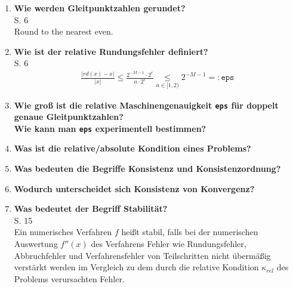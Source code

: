 \begin{enumerate}
		\item \textbf{Wie werden Gleitpunktzahlen gerundet?} \\
		S. 6 \\
		Round to the nearest even.
		\item \textbf{Wie ist der relative Rundungsfehler definiert?} \\
		S. 6
		\begin{align*}
			\frac{|rd(x)-x|}{|x|}\leq \frac{2^{-M-1}\cdot2^e}{a\cdot 2^e}\underset{a\in[1,2)}{\leq}2^{-M-1}=:\texttt{eps}
		\end{align*}
		
		\item \textbf{Wie groß ist die relative Maschinengenauigkeit \texttt{eps} für doppelt genaue Gleitpunktzahlen?\\
					Wie kann man \texttt{eps} experimentell bestimmen?} \\
				
				
		\item \textbf{Was ist die relative/absolute Kondition eines Problems?} \\
		
		
		\item \textbf{Was bedeuten die Begriffe Konsistenz und Konsistenzordnung?} \\
		
		
		\item \textbf{Wodurch unterscheidet sich Konsistenz von Konvergenz?} \\
		
		
		\item \textbf{Was bedeutet der Begriff Stabilität?} \\
		S. 15\\
		Ein numerisches Verfahren $f$ heißt stabil, falls bei der numerischen Auswertung $f''(x)$ des Verfahrens Fehler wie Rundungsfehler, Abbruchfehler und Verfahrensfehler von Teilschritten nicht	übermäßig verstärkt werden im Vergleich zu dem durch die relative Kondition $\kappa_{rel}$ des Problems
		verursachten Fehler.
		
	\end{enumerate}